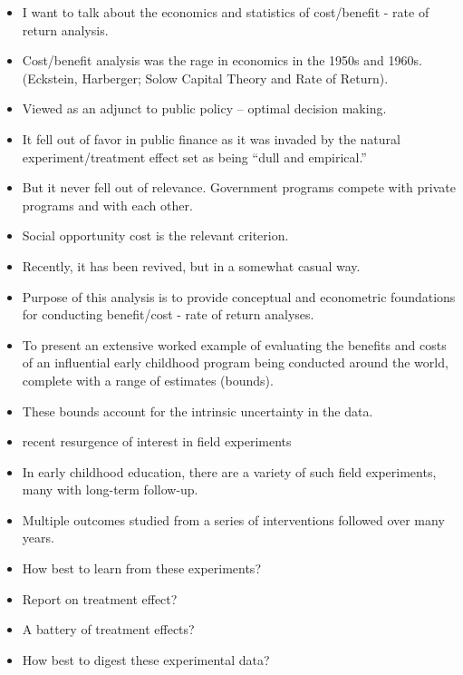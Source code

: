 \documentclass[static]{JJH-Beamer}
\begin{document}

\begin{itemize}
\item I want to talk about the economics and statistics of cost/benefit - rate of return analysis.
\item Cost/benefit analysis was the rage in economics in the 1950s and 1960s. (Eckstein, Harberger; Solow Capital Theory and Rate of Return).
\item Viewed as an adjunct to public policy -- optimal decision making.
\item It fell out of favor in public finance as it was invaded by the natural experiment/treatment effect set as being ``dull and empirical.''
\item But it never fell out of relevance. Government programs compete with private programs and with each other.
\item Social opportunity cost is the relevant criterion.
\item Recently, it has been revived, but in a somewhat casual way.
\item Purpose of this analysis is to provide conceptual and econometric foundations for conducting benefit/cost - rate of return analyses.
\item To present an extensive worked example of evaluating the benefits and costs of an influential early childhood program being conducted around the world, complete with a range of estimates (bounds).
\item These bounds account for the intrinsic uncertainty in the data.
\end{itemize}

\begin{itemize}
\item recent resurgence of interest in field experiments
\item In early childhood education, there are a variety of such field experiments, many with long-term follow-up.
\item Multiple outcomes studied from a series of interventions followed over many years.
\item How best to learn from these experiments?
\item Report on treatment effect?
\item A battery of treatment effects?
\item How best to digest these experimental data?
\end{itemize}
\end{document}
